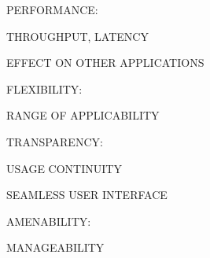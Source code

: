 \begin{bwslide}

\begin{nrtc}
\item	PERFORMANCE:
    \begin{nrtc}
    \item	THROUGHPUT, LATENCY

    \item	EFFECT ON OTHER APPLICATIONS
    \end{nrtc}

\item	FLEXIBILITY:
    \begin{nrtc}
    \item	RANGE OF APPLICABILITY
    \end{nrtc}
\end{nrtc}
\end{bwslide}


\begin{bwslide}

\begin{nrtc}
\item	TRANSPARENCY:
    \begin{nrtc}
    \item	USAGE CONTINUITY

    \item	SEAMLESS USER INTERFACE
    \end{nrtc}

\item	AMENABILITY:
    \begin{nrtc}
    \item	MANAGEABILITY
    \end{nrtc}
\end{nrtc}
\end{bwslide}



